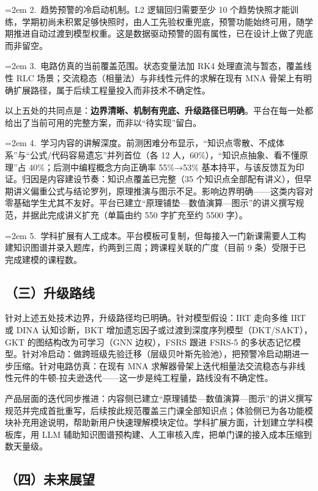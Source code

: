 \documentclass[zihao=-4,a4paper,UTF8,fontset=windows]{ctexart}
\begin{document}
\noindent\hangindent=2em 2.~趋势预警的冷启动机制。L2 逻辑回归需要至少 10 个趋势快照才能训练，学期初尚未积累足够快照时，由人工先验权重兜底，预警功能始终可用，随学期推进自动过渡到模型权重。这是数据驱动预警的固有属性，已在设计上做了兜底而非留空。

\noindent\hangindent=2em 3.~电路仿真的当前覆盖范围。状态变量法加 RK4 处理直流与暂态，覆盖线性 RLC 场景；交流稳态（相量法）与非线性元件的求解在现有 MNA 骨架上有明确扩展路径，属于后续工程量投入而非技术不确定性。

以上五处的共同点是：\textbf{边界清晰、机制有兜底、升级路径已明确}。平台在每一处都给出了当前可用的完整方案，而非以“待实现”留白。

\noindent\hangindent=2em 4.~学习内容的讲解深度。前测困难分布显示，“知识点零散、不成体系”与“公式/代码容易遗忘”并列首位（各 12 人，60\%），“知识点抽象、看不懂原理”占 40\%；后测中编程概念方向正确率 55\%→53\% 基本持平，与该反馈互为印证。归因是内容建设节奏：知识点覆盖已完整（35 个知识点全部配有讲义），但早期讲义偏重公式与结论罗列，原理推演与图示不足。影响边界明确——这类内容对零基础学生尤其不友好。平台已建立“原理铺垫—数值演算—图示”的讲义撰写规范，并据此完成讲义扩充（单篇由约 550 字扩充至约 5500 字）。

\noindent\hangindent=2em 5.~学科扩展有人工成本。平台模板可复制，但每接入一门新课需要人工构建知识图谱并录入题库，约两到三周；跨课程关联的广度（目前 9 条）受限于已完成建模的课程数。

\subsection{（三）升级路线}


针对上述五处技术边界，升级路径均已明确。针对模型假设：IRT 走向多维 IRT 或 DINA 认知诊断，BKT 增加遗忘因子或过渡到深度序列模型（DKT/SAKT），GKT 的图结构改为可学习（GNN 边权），FSRS 跟进 FSRS-5 的多状态记忆模型。针对冷启动：做跨班级先验迁移（层级贝叶斯先验池），把预警冷启动期进一步压缩。针对电路仿真：在现有 MNA 求解器骨架上迭代相量法交流稳态与非线性元件的牛顿-拉夫逊迭代——这一步是纯工程量，路线没有不确定性。

产品层面的迭代同步推进：内容侧已建立“原理铺垫—数值演算—图示”的讲义撰写规范并完成首批重写，后续按此规范覆盖三门课全部知识点；体验侧已为各功能模块补充用途说明，帮助新用户快速理解模块定位。学科扩展方面，计划建立学科模板库，用 LLM 辅助知识图谱预构建、人工审核入库，把单门课的接入成本压缩到数天量级。

\subsection{（四）未来展望}
\end{document}
